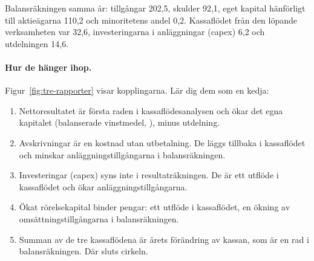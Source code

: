 Balansräkningen samma år: tillgångar 202,5, skulder 92,1, eget kapital hänförligt till
aktieägarna 110,2 och minoritetens andel 0,2. Kassaflödet från den löpande verksamheten var
32,6, investeringarna i anläggningar (capex) 6,2 och utdelningen 14,6.

\paragraph{Hur de hänger ihop.} Figur~\ref{fig:tre-rapporter} visar kopplingarna. Lär dig dem som
en kedja:

\begin{enumerate}
  \item Nettoresultatet är första raden i kassaflödesanalysen och ökar det egna kapitalet
    (balanserade vinstmedel, ), minus utdelning.
  \item Avskrivningar är en kostnad utan utbetalning. De läggs tillbaka i kassaflödet och minskar
    anläggningstillgångarna i balansräkningen.
  \item Investeringar (capex) syns inte i resultaträkningen. De är ett utflöde i kassaflödet och
    ökar anläggningstillgångarna.
  \item Ökat rörelsekapital binder pengar: ett utflöde i kassaflödet, en ökning av
    omsättningstillgångarna i balansräkningen.
  \item Summan av de tre kassaflödena är årets förändring av kassan, som är en rad i
    balansräkningen. Där sluts cirkeln.
\end{enumerate}

